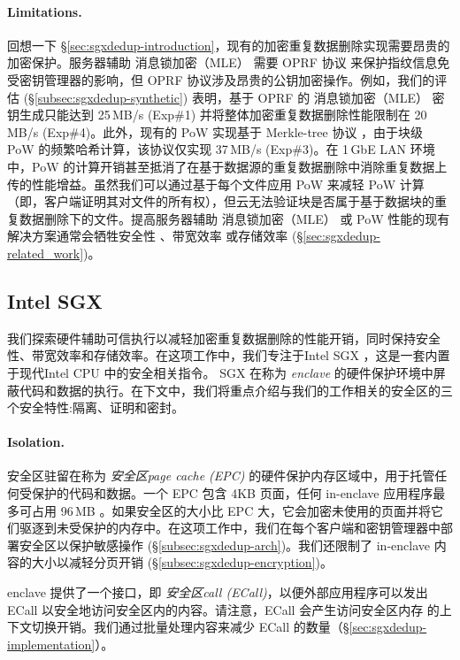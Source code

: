 \paragraph*{Limitations.} 回想一下 \S\ref{sec:sgxdedup-introduction}，现有的加密重复数据删除实现需要昂贵的加密保护。服务器辅助 消息锁加密（MLE） 需要 OPRF 协议 \cite{naor04} 来保护指纹信息免受密钥管理器的影响，但 OPRF 协议涉及昂贵的公钥加密操作。例如，我们的评估 (\S\ref{subsec:sgxdedup-synthetic}) 表明，基于 OPRF 的 消息锁加密（MLE） 密钥生成只能达到 25\,MB/s (Exp\#1) 并将整体加密重复数据删除性能限制在 20 \,MB/s (Exp\#4)。此外，现有的 PoW 实现基于 Merkle-tree 协议 \cite{halevi11}，由于块级 PoW 的频繁哈希计算，该协议仅实现 37\,MB/s (Exp\#3)。在 1\,GbE LAN 环境中，PoW 的计算开销甚至抵消了在基于数据源的重复数据删除中消除重复数据上传的性能增益。虽然我们可以通过基于每个文件应用 PoW 来减轻 PoW 计算（即，客户端证明其对文件的所有权），但云无法验证块是否属于基于数据块的重复数据删除下的文件。提高服务器辅助 消息锁加密（MLE） 或 PoW 性能的现有解决方案通常会牺牲安全性 \cite{li20b,xu13,pietro12}、带宽效率 \cite{harnik10,li15} 或存储效率 \cite{zhou15,qin17,li20b} (\S\ref{sec:sgxdedup-related_work})。

\subsection{Intel SGX}
\label{subsec:sgxdedup-sgx} 

我们探索硬件辅助可信执行以减轻加密重复数据删除的性能开销，同时保持安全性、带宽效率和存储效率。在这项工作中，我们专注于Intel SGX \cite{sgx}，这是一套内置于现代Intel CPU 中的安全相关指令。 SGX 在称为 \textit{ enclave} 的硬件保护环境中屏蔽代码和数据的执行。在下文中，我们将重点介绍与我们的工作相关的安全区的三个安全特性:隔离、证明和密封。

\paragraph*{Isolation.}安全区驻留在称为 \textit{安全区page cache (EPC)} 的硬件保护内存区域中，用于托管任何受保护的代码和数据。一个 EPC 包含 4KB 页面，任何 in-enclave 应用程序最多可占用 96\,MB \cite{harnik18}。如果安全区的大小比 EPC 大，它会加密未使用的页面并将它们驱逐到未受保护的内存中。在这项工作中，我们在每个客户端和密钥管理器中部署安全区以保护敏感操作 (\S\ref{subsec:sgxdedup-arch})。我们还限制了 in-enclave 内容的大小以减轻分页开销 (\S\ref{subsec:sgxdedup-encryption})。

enclave 提供了一个接口，即 \textit{安全区call (ECall)}，以便外部应用程序可以发出 ECall 以安全地访问安全区内的内容。请注意，ECall 会产生访问安全区内存 \cite{harnik18} 的上下文切换开销。我们通过批量处理内容来减少 ECall 的数量（\S\ref{sec:sgxdedup-implementation}）。

